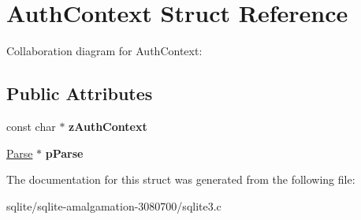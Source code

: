 \hypertarget{struct_auth_context}{\section{Auth\+Context Struct Reference}
\label{struct_auth_context}
}


Collaboration diagram for Auth\+Context\+:
\subsection*{Public Attributes}
\begin{DoxyCompactItemize}
\item 
\hypertarget{struct_auth_context_a1b095b152b72326476ac3f7edcaee78a}{const char $\ast$ {\bfseries z\+Auth\+Context}}\label{struct_auth_context_a1b095b152b72326476ac3f7edcaee78a}

\item 
\hypertarget{struct_auth_context_a8df2931d8f4facf59073c92315b00bfa}{\hyperlink{struct_parse}{Parse} $\ast$ {\bfseries p\+Parse}}\label{struct_auth_context_a8df2931d8f4facf59073c92315b00bfa}

\end{DoxyCompactItemize}


The documentation for this struct was generated from the following file\+:\begin{DoxyCompactItemize}
\item 
sqlite/sqlite-\/amalgamation-\/3080700/sqlite3.\+c\end{DoxyCompactItemize}
